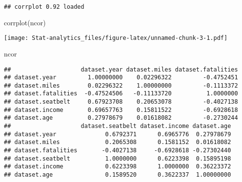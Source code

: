 \documentclass[
]{article}
\newenvironment{Shaded}{\begin{snugshade}}{\end{snugshade}}
\newcommand{\CommentTok}[1]{\textcolor[rgb]{0.56,0.35,0.01}{\textit{#1}}}
\newcommand{\FunctionTok}[1]{\textcolor[rgb]{0.00,0.00,0.00}{#1}}
\newcommand{\NormalTok}[1]{#1}
\newcommand{\OtherTok}[1]{\textcolor[rgb]{0.56,0.35,0.01}{#1}}
\newcommand{\SpecialCharTok}[1]{\textcolor[rgb]{0.00,0.00,0.00}{#1}}
\begin{document}
\begin{verbatim}
## corrplot 0.92 loaded
\end{verbatim}

\begin{Shaded}
\begin{Highlighting}[]
\FunctionTok{corrplot}\NormalTok{(ncor)}
\end{Highlighting}
\end{Shaded}

\texttt{[image: Stat-analytics\_files/figure-latex/unnamed-chunk-3-1.pdf]}

\begin{Shaded}
\begin{Highlighting}[]
\NormalTok{ncor}
\end{Highlighting}
\end{Shaded}

\begin{verbatim}
##                    dataset.year dataset.miles dataset.fatalities
## dataset.year         1.00000000    0.02296322         -0.4752451
## dataset.miles        0.02296322    1.00000000         -0.1113372
## dataset.fatalities  -0.47524506   -0.11133720          1.0000000
## dataset.seatbelt     0.67923708    0.20653078         -0.4027138
## dataset.income       0.69657763    0.15811522         -0.6928618
## dataset.age          0.27978679    0.01618082         -0.2730244
##                    dataset.seatbelt dataset.income dataset.age
## dataset.year              0.6792371      0.6965776  0.27978679
## dataset.miles             0.2065308      0.1581152  0.01618082
## dataset.fatalities       -0.4027138     -0.6928618 -0.27302440
## dataset.seatbelt          1.0000000      0.6223398  0.15895198
## dataset.income            0.6223398      1.0000000  0.36223372
## dataset.age               0.1589520      0.3622337  1.00000000
\end{verbatim}

\begin{Shaded}
\end{Shaded}
\end{document}
